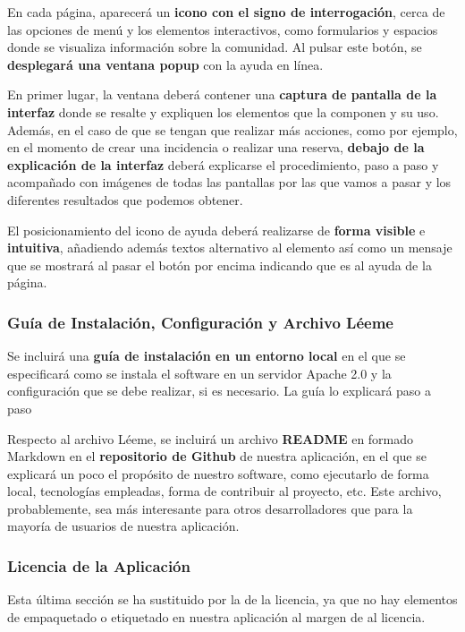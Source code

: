 En cada página, aparecerá un \textbf{icono con el signo de interrogación}, cerca de las opciones de menú y los elementos interactivos, como formularios y espacios donde se visualiza información sobre la comunidad. Al pulsar este botón, se \textbf{desplegará una ventana popup} con la ayuda en línea. 

En primer lugar, la ventana deberá contener una \textbf{captura de pantalla de la interfaz} donde se resalte y expliquen los elementos que la componen y su uso. Además, en el caso de que se tengan que realizar más acciones, como por ejemplo, en el momento de crear una incidencia o realizar una reserva, \textbf{debajo de la explicación de la interfaz} deberá explicarse el procedimiento, paso a paso y acompañado con imágenes de todas las pantallas por las que vamos a pasar y los diferentes resultados que podemos obtener. 

El posicionamiento del icono de ayuda deberá realizarse de \textbf{forma visible} e \textbf{intuitiva}, añadiendo además textos alternativo al elemento así como un mensaje que se mostrará al pasar el botón por encima indicando que es al ayuda de la página. 																																					



\subsubsection{Guía de Instalación, Configuración y Archivo Léeme} 
Se incluirá una \textbf{guía de instalación en un entorno local} en el que se especificará como se instala el software en un servidor Apache 2.0 y la configuración que se debe realizar, si es necesario. La guía lo explicará paso a paso 

Respecto al archivo Léeme, se incluirá un archivo \textbf{README} en formado \gls{Markdown} en el \textbf{repositorio de Github} de nuestra aplicación, en el que se explicará un poco el propósito de nuestro software, como ejecutarlo de forma local, tecnologías empleadas, forma de contribuir al proyecto, etc. Este archivo, probablemente, sea más interesante para otros desarrolladores que para la mayoría de usuarios de nuestra aplicación.

\subsubsection{Licencia de la Aplicación}
Esta última sección se ha sustituido por la de la licencia, ya que no hay elementos de empaquetado  o etiquetado en nuestra aplicación al margen de al licencia.

